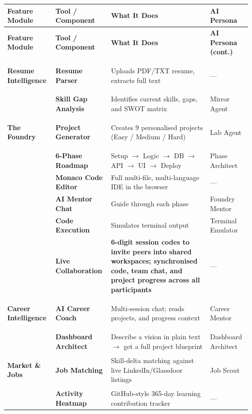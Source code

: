 \documentclass[11pt, a4paper]{article}
\begin{document}
{
\renewcommand{\arraystretch}{1.4} %
\small
\begin{longtable}{@{} 
    >{\raggedright\bfseries}p{3cm} 
    >{\raggedright\bfseries}p{3.5cm} 
    >{\raggedright}p{7cm} 
    >{\raggedright\arraybackslash}p{2.5cm} @{}}
\toprule
\textbf{Feature Module} & \textbf{Tool / Component} & \textbf{What It Does} & \textbf{AI Persona} \\
\midrule
\endfirsthead

\toprule
\textbf{Feature Module} & \textbf{Tool / Component} & \textbf{What It Does} & \textbf{AI Persona (cont.)} \\
\midrule
\endhead

\bottomrule
\endfoot

\bottomrule
\endlastfoot

\textbf{Resume Intelligence} & Resume Parser & Uploads PDF/TXT resume, extracts full text & --- \\
 & Skill Gap Analysis & Identifies current skills, gaps, and SWOT matrix & Mirror Agent \\
\midrule

\textbf{The Foundry} & Project Generator & Creates 9 personalised projects (Easy / Medium / Hard) & Lab Agent \\
 & 6-Phase Roadmap & Setup $\rightarrow$ Logic $\rightarrow$ DB $\rightarrow$ API $\rightarrow$ UI $\rightarrow$ Deploy & Phase Architect \\
 & Monaco Code Editor & Full multi-file, multi-language IDE in the browser & --- \\
 & AI Mentor Chat & Guide through each phase & Foundry Mentor \\
 & Code Execution & Simulates terminal output & Terminal Emulator \\
 & \textbf{Live Collaboration} & \textbf{6-digit session codes to invite peers into shared workspaces; synchronised code, team chat, and project progress across all participants} & --- \\
\midrule

\textbf{Career Intelligence} & AI Career Coach & Multi-session chat; reads projects, and progress context & Career Mentor \\
 & Dashboard Architect & Describe a vision in plain text $\rightarrow$ get a full project blueprint & Dashboard Architect \\
\midrule

\textbf{Market \& Jobs} & Job Matching & Skill-delta matching against live LinkedIn/Glassdoor listings & Job Scout \\
 & Activity Heatmap & GitHub-style 365-day learning contribution tracker & --- \\
\midrule


\end{longtable}}
\end{document}
